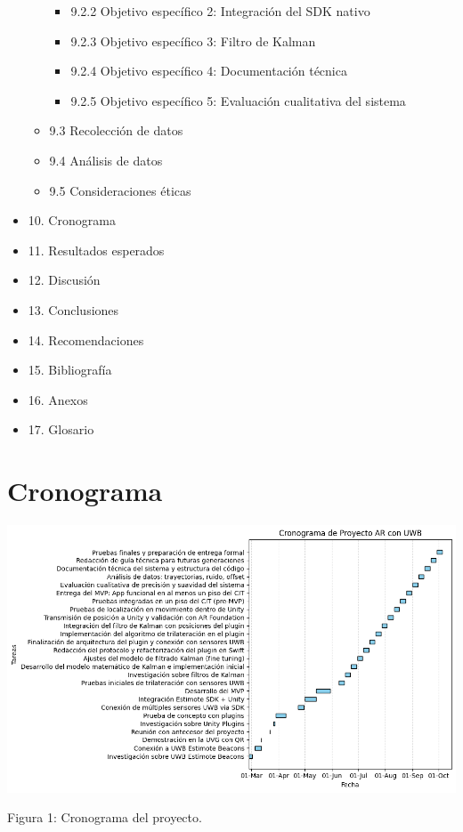 \documentclass{article}
\begin{document}
\begin{itemize}
\begin{itemize}
\begin{itemize}
      \item 9.2.2 Objetivo específico 2: Integración del SDK nativo
      \item 9.2.3 Objetivo específico 3: Filtro de Kalman
      \item 9.2.4 Objetivo específico 4: Documentación técnica
      \item 9.2.5 Objetivo específico 5: Evaluación cualitativa del sistema
    \end{itemize}
    \item 9.3 Recolección de datos
    \item 9.4 Análisis de datos
    \item 9.5 Consideraciones éticas
  \end{itemize}
  \item 10. Cronograma
  \item 11. Resultados esperados
  \item 12. Discusión
  \item 13. Conclusiones
  \item 14. Recomendaciones
  \item 15. Bibliografía
  \item 16. Anexos
  \item 17. Glosario
\end{itemize}
\newpage

\section{Cronograma}

\vspace{15mm} 
\includegraphics[width=1\textwidth]{images/cronograma2.png}
{\begin{center}
    Figura 1: Cronograma del proyecto.
\end{center}}
\newpage
\end{document}
